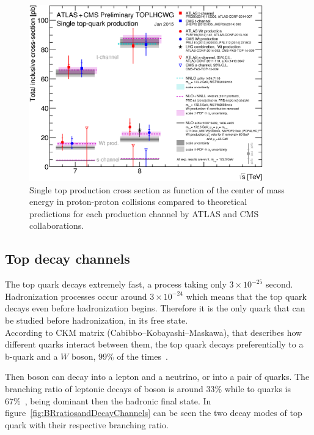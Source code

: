 \begin{figure}[!Hhtbp]
  \begin{center}
    \includegraphics[width=0.9\textwidth]{figs/singletop_allchanvsroots.png}
    \caption{Single top production cross section as function of the center of mass energy in proton-proton collisions compared to theoretical predictions for each production channel by ATLAS and CMS collaborations.}
    \label{fig:SingleProduction}
  \end{center}
\end{figure}


\subsection{Top decay channels}

The top quark decays extremely fast, a process taking only $3\times 10^{-25}$ second. Hadronization processes occur around $3\times 10^{-24}$ which means that the top quark decays even before hadronization begins. Therefore it is the only quark that can be studied before hadronization, in its free state. \\ According to CKM matrix (Cabibbo–Kobayashi–Maskawa), that describes how different quarks interact between them, the top quark decays preferentially to a b-quark and a $W$ boson, 99\% of the times~\cite{Agashe:2014kda}. 

Then \W boson can decay into a lepton and a neutrino, or into a pair of quarks. The branching ratio of leptonic decays of \W boson is around 33\% while to quarks is 67\%~\cite{Agashe:2014kda}, being dominant then the hadronic final state. In figure~\ref{fig:BRratiosandDecayChannels} can be seen the two decay modes of top quark with their respective branching ratio. 

